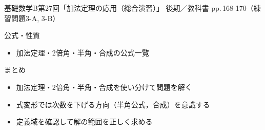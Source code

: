 \documentclass[aspectratio=43,professionalfonts,handout]{beamer}
\newcommand{\LectureNum}{27}
\newcommand{\LectureTitle}{加法定理の応用（総合演習）}
\newcommand{\TextPages}{pp.\,168-170（練習問題3-A, 3-B）}
\newcommand{\CourseName}{基礎数学B}
\renewcommand{\TermName}{後期}
\begin{document}
\begin{frame}{\CourseName\quad 第\LectureNum 回「\LectureTitle 」}
  {\small \TermName\quad \TeacherName\quad ／\quad 教科書 \TextPages}

\end{frame}

\begin{frame}{公式・性質}
  \begin{block}{}
  \begin{itemize}
    \item 加法定理・2倍角・半角・合成の公式一覧
  \end{itemize}
  \end{block}
\end{frame}

\begin{frame}{まとめ}
  \begin{itemize}
    \item 加法定理・2倍角・半角・合成を使い分けて問題を解く
    \item 式変形では次数を下げる方向（半角公式，合成）を意識する
    \item 定義域を確認して解の範囲を正しく求める
  \end{itemize}
\end{frame}
\end{document}
